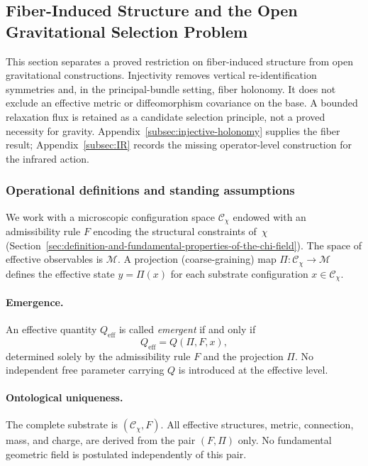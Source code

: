 \subsection{Fiber-Induced Structure and the Open Gravitational Selection Problem}
  \label{sec:necessity-noninjective}

  This section separates a proved restriction on fiber-induced structure from open gravitational constructions.
  Injectivity removes vertical re-identification symmetries and, in the principal-bundle setting, fiber holonomy.
  It does not exclude an effective metric or diffeomorphism covariance on the base.
  A bounded relaxation flux is retained as a candidate selection principle, not a proved necessity for gravity.
  Appendix~\ref{subsec:injective-holonomy} supplies the fiber result;
  Appendix~\ref{subsec:IR} records the missing operator-level construction for the infrared action.

  \subsubsection*{Operational definitions and standing assumptions}
    \label{subsec:necessity-defs}

    We work with a microscopic configuration space $\mathcal{C}_\chi$ endowed
    with an admissibility rule $F$ encoding the structural constraints of~$\chi$
    (Section~\ref{sec:definition-and-fundamental-properties-of-the-chi-field}).
    The space of effective observables is $\mathcal{M}$.
    A projection (coarse-graining) map $\Pi : \mathcal{C}_\chi \to \mathcal{M}$ defines the
    effective state $y = \Pi(x)$ for each substrate configuration $x \in \mathcal{C}_\chi$.

    \paragraph{Emergence.}
      An effective quantity $Q_{\mathrm{eff}}$ is called \emph{emergent} if and only if
    \begin{equation}
      Q_{\mathrm{eff}} = Q(\Pi, F, x),
      \end{equation}
      determined solely by the admissibility rule $F$ and the projection $\Pi$.
      No independent free parameter carrying $Q$ is introduced at the effective level.

    \paragraph{Ontological uniqueness.}
      The complete substrate is $(\mathcal{C}_\chi, F)$.
      All effective structures, metric, connection, mass, and charge, are derived from the pair $(F, \Pi)$ only.
      No fundamental geometric field is postulated independently of this pair.


